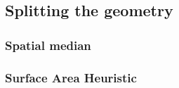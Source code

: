 \subsection{Splitting the geometry}










\subsubsection{Spatial median}







\subsubsection{Surface Area Heuristic}

